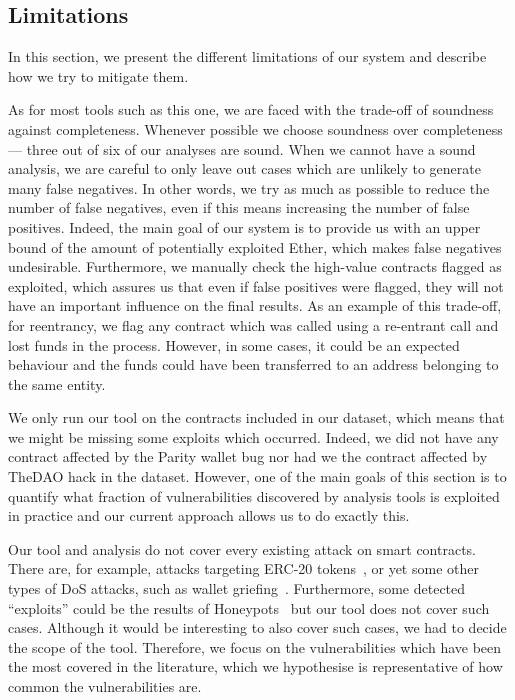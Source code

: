 \subsection{Limitations}
\label{sec:5a:limitations} 
In this section, we present the different limitations of our system and describe how we try to mitigate them.

 As for most tools such as this one, we are faced with the trade-off of soundness against completeness. Whenever possible we choose soundness over completeness --- three out of six of our analyses are sound. When we cannot have a sound analysis, we are careful to only leave out cases which are unlikely to generate many false negatives. In other words, we try as much as possible to reduce the number of false negatives, even if this means increasing the number of false positives.
Indeed, the main goal of our system is to provide us with an upper bound of the amount of potentially exploited Ether, which makes false negatives undesirable.
Furthermore, we manually check the high-value contracts flagged as exploited, which assures us that even if false positives were flagged, they will not have an important influence on the final results.
As an example of this trade-off, for reentrancy, we flag any contract which was called using a re-entrant call and lost funds in the process. However, in some cases, it could be an expected behaviour and the funds could have been transferred to an address belonging to the same entity.

 We only run our tool on the contracts included in our dataset, which means that we might be missing some exploits which occurred. Indeed, we did not have any contract affected by the Parity wallet bug nor had we the contract affected by TheDAO hack in the dataset.
However, one of the main goals of this section is to quantify what fraction of vulnerabilities discovered by analysis tools is exploited in practice and our current approach allows us to do exactly this.

 Our tool and analysis do not cover every existing attack on smart contracts. There are, for example, attacks targeting ERC-20 tokens~\cite{8802438}, or yet some other types of DoS attacks, such as wallet griefing~\cite{Grech2018}.
Furthermore, some detected ``exploits'' could be the results of Honeypots~\cite{236240} but our tool does not cover such cases.
Although it would be interesting to also cover such cases, we had to decide the scope of the tool. Therefore, we focus on the vulnerabilities which have been the most covered in the literature, which we hypothesise is representative of how common the vulnerabilities are.
